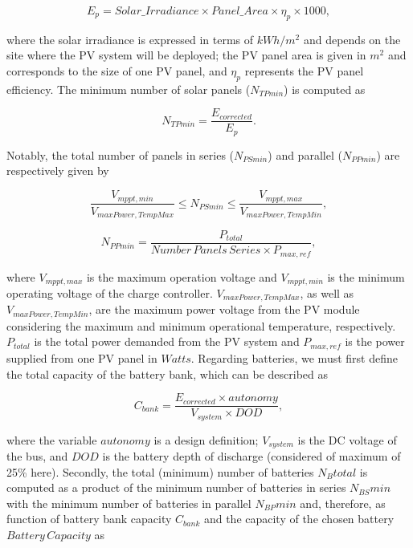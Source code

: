 \documentclass[runningheads]{llncs}
\begin{document}
\begin{equation}
\label{eq:Ep}
E_{p} = Solar\_Irradiance \times Panel\_Area \times \eta_{p} \times 1000,
\end{equation}

\noindent where the solar irradiance is expressed in terms of $kWh/m^{2}$ and depends on the site where the PV system will be deployed; 
the PV panel area is given in $m^{2}$ and corresponds to the size of one PV panel, and $\eta_{p}$ represents the PV panel efficiency.
The minimum number of solar panels ($N_{TPmin}$) is computed as

\begin{equation}
\label{eq:NTPmin}
N_{TPmin} = \frac{E_{corrected}}{E_{p}}.
\end{equation}

Notably, the total number of panels in series ($N_{PSmin}$) and parallel ($N_{PPmin}$) are respectively given by

\begin{equation}
\label{eq:NPSmin}
\frac{V_{mppt,min}}{V_{maxPower,TempMax}} \leq N_{PSmin} \leq \frac{V_{mppt,max}}{V_{maxPower,TempMin}},
\end{equation}

\begin{equation}
\label{eq:NPPmin}
N_{PPmin} = \frac{P_{total}}{Number\,Panels\,Series \times P_{max,ref}},
\end{equation}

\noindent where $V_{mppt, max}$ is the maximum operation voltage and $V_{mppt,min}$ is the minimum operating voltage of the charge controller. $V_{maxPower, TempMax}$, as well as $V_{maxPower, TempMin}$, are the maximum power voltage from the PV module considering the maximum and minimum operational temperature, respectively. $P_{total}$ is the total power demanded from the PV system and $P_{max, ref}$ is the power supplied from one PV panel in $Watts$. Regarding batteries, we must first define the total capacity of the battery bank, which can be described as

\begin{equation}
\label{eq:Cbank}
C_{bank} = \frac{E_{corrected} \times autonomy}{V_{system} \times DOD},
\end{equation}

\noindent where the variable $autonomy$ is a design definition; 
$ V_{system} $ is the DC voltage of the bus, and $ DOD $ is the battery depth of discharge (considered of maximum of 25\% here).
Secondly, the total (minimum) number of batteries $N_{B}total$ is computed as a product of the minimum number of batteries in series $N_{BS}min$ with the minimum number of batteries in parallel $ N_{BP}min $ and, therefore, as function of battery bank capacity $ C_{bank} $ and the capacity of the chosen battery $ Battery \, Capacity $ as
\end{document}
